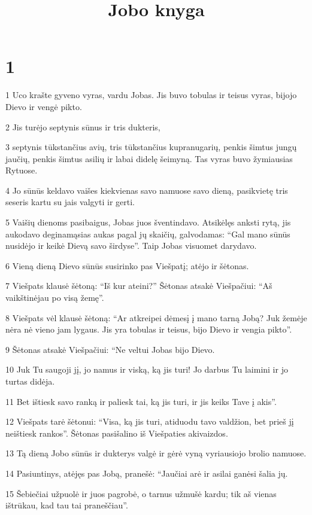 

\title{Jobo knyga}

\chapter{1}

\par 1 Uco krašte gyveno vyras, vardu Jobas. Jis buvo tobulas ir teisus vyras, bijojo Dievo ir vengė pikto. 
\par 2 Jis turėjo septynis sūnus ir tris dukteris, 
\par 3 septynis tūkstančius avių, tris tūkstančius kupranugarių, penkis šimtus jungų jaučių, penkis šimtus asilių ir labai didelę šeimyną. Tas vyras buvo žymiausias Rytuose. 
\par 4 Jo sūnūs keldavo vaišes kiekvienas savo namuose savo dieną, pasikvietę tris seseris kartu su jais valgyti ir gerti. 
\par 5 Vaišių dienoms pasibaigus, Jobas juos šventindavo. Atsikėlęs anksti rytą, jis aukodavo deginamąsias aukas pagal jų skaičių, galvodamas: “Gal mano sūnūs nusidėjo ir keikė Dievą savo širdyse”. Taip Jobas visuomet darydavo. 
\par 6 Vieną dieną Dievo sūnūs susirinko pas Viešpatį; atėjo ir šėtonas. 
\par 7 Viešpats klausė šėtoną: “Iš kur ateini?” Šėtonas atsakė Viešpačiui: “Aš vaikštinėjau po visą žemę”. 
\par 8 Viešpats vėl klausė šėtoną: “Ar atkreipei dėmesį į mano tarną Jobą? Juk žemėje nėra nė vieno jam lygaus. Jis yra tobulas ir teisus, bijo Dievo ir vengia pikto”. 
\par 9 Šėtonas atsakė Viešpačiui: “Ne veltui Jobas bijo Dievo. 
\par 10 Juk Tu saugoji jį, jo namus ir viską, ką jis turi! Jo darbus Tu laimini ir jo turtas didėja. 
\par 11 Bet ištiesk savo ranką ir paliesk tai, ką jis turi, ir jis keiks Tave į akis”. 
\par 12 Viešpats tarė šėtonui: “Visa, ką jis turi, atiduodu tavo valdžion, bet prieš jį neištiesk rankos”. Šėtonas pasišalino iš Viešpaties akivaizdos. 
\par 13 Tą dieną Jobo sūnūs ir dukterys valgė ir gėrė vyną vyriausiojo brolio namuose. 
\par 14 Pasiuntinys, atėjęs pas Jobą, pranešė: “Jaučiai arė ir asilai ganėsi šalia jų. 
\par 15 Šebiečiai užpuolė ir juos pagrobė, o tarnus užmušė kardu; tik aš vienas ištrūkau, kad tau tai praneščiau”. 
